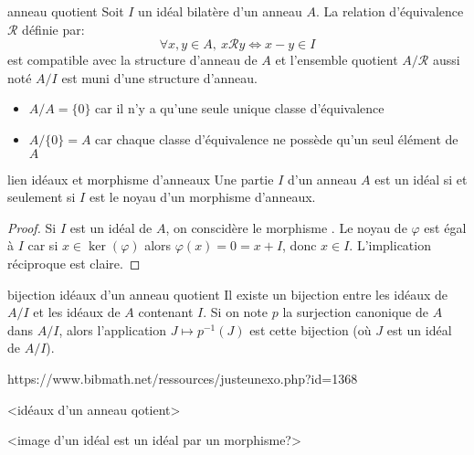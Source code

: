 \begin{definition}{anneau quotient}{}
    Soit $I$ un idéal bilatère d'un anneau $A$. La relation d'équivalence $\mathcal{R}$ définie par:
    \[ \forall x, y \in A, ~ x \mathcal{R} y \Longleftrightarrow x - y \in I \]
    est compatible avec la structure d'anneau de $A$ et l'ensemble quotient $A/\mathcal{R}$
    aussi noté $A/I$ est muni d'une structure d'anneau.
\end{definition}

\begin{example}{}{}
    \begin{itemize}
        \item $A / A = \{0\}$ car il n'y a qu'une seule unique classe d'équivalence
        \item $A / \{0\} = A$ car chaque classe d'équivalence ne possède qu'un seul élément de $A$
    \end{itemize}
\end{example}


\begin{proposition}{lien idéaux et morphisme d'anneaux}{}
    Une partie $I$ d'un anneau $A$ est un idéal si et seulement si $I$
    est le noyau d'un morphisme d'anneaux.
\end{proposition}

\begin{proof}
    Si $I$ est un idéal de $A$, on conscidère le morphisme . \newline
    Le noyau de $\varphi$ est égal à $I$ car si $x \in \ker(\varphi)$ alors $\varphi(x) = 0 = x + I$,
    donc $x \in I$.
    L'implication réciproque est claire.
\end{proof}


\begin{theorem}{bijection idéaux d'un anneau quotient}{}
    Il existe un bijection entre les idéaux de $A/I$ et les idéaux de $A$ contenant $I$.\newline
    Si on note $p$ la surjection canonique de $A$ dans $A/I$, 
    alors l'application $J \mapsto p^{-1}(J)$ est cette bijection 
    (où $J$ est un idéal de $A/I$).
\end{theorem}



https://www.bibmath.net/ressources/justeunexo.php?id=1368

<idéaux d'un anneau qotient>

<image d'un idéal est un idéal par un morphisme?>

